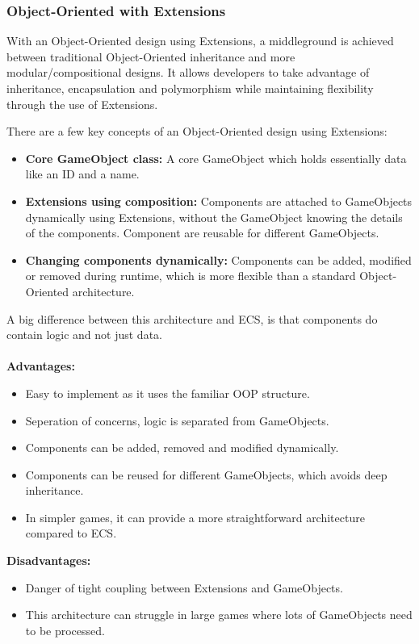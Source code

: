 \subsubsection{Object-Oriented with Extensions}
With an Object-Oriented design using Extensions, a middleground is achieved between traditional Object-Oriented inheritance and more modular/compositional designs.
It allows developers to take advantage of inheritance, encapsulation and polymorphism while maintaining flexibility through the use of Extensions.

\noindent There are a few key concepts of an Object-Oriented design using Extensions:
\begin{itemize}
      \item \textbf{Core GameObject class:}
            A core GameObject which holds essentially data like an ID and a name.
      \item \textbf{Extensions using composition:}
            Components are attached to GameObjects dynamically using Extensions, without the GameObject knowing the details of the components.
            Component are reusable for different GameObjects.
      \item \textbf{Changing components dynamically:}
            Components can be added, modified or removed during runtime, which is more flexible than a standard Object-Oriented architecture. 
\end{itemize}

\noindent A big difference between this architecture and ECS, is that components do contain logic and not just data.
\\\\
\noindent \textbf{Advantages:}
\begin{itemize}
      \item Easy to implement as it uses the familiar OOP structure.
      \item Seperation of concerns, logic is separated from GameObjects.
      \item Components can be added, removed and modified dynamically.
      \item Components can be reused for different GameObjects, which avoids deep inheritance.
      \item In simpler games, it can provide a more straightforward architecture compared to ECS.
\end{itemize}

\noindent \textbf{Disadvantages:}
\begin{itemize}
      \item Danger of tight coupling between Extensions and GameObjects.
      \item This architecture can struggle in large games where lots of GameObjects need to be processed.
\end{itemize}
